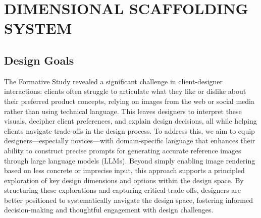 \section{DIMENSIONAL SCAFFOLDING SYSTEM}
\subsection{Design Goals}
The Formative Study revealed a significant challenge in client-designer interactions: clients often struggle to articulate what they like or dislike about their preferred product concepts, relying on images from the web or social media rather than using technical language. This leaves designers to interpret these visuals, decipher client preferences, and explain design decisions, all while helping clients navigate trade-offs in the design process. To address this, we aim to equip designers—especially novices—with domain-specific language that enhances their ability to construct precise prompts for generating accurate reference images through large language models (LLMs). Beyond simply enabling image rendering based on less concrete or imprecise input, this approach supports a principled exploration of key design dimensions and options within the design space. By structuring these explorations and capturing critical trade-offs, designers are better positioned to systematically navigate the design space, fostering informed decision-making and thoughtful engagement with design challenges.

